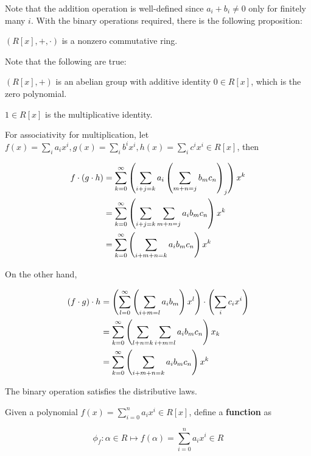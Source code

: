 \documentclass[a4paper,12pt]{article}
\begin{document}
Note that the addition operation is well-defined since $a_{i}+b_{i}\neq 0$ only for finitely many $i$. With the binary operations required, there is the following proposition:\n

\begin{pst}
  $(R[x],+,\cdot)$ is a nonzero commutative ring.\n

  \prf Note that the following are true:

  \begin{alist}
    \item $(R[x],+)$ is an abelian group with additive identity $0\in R[x]$, which is the zero polynomial.
    \item $1\in R[x]$ is the multiplicative identity.
    \item For associativity for multiplication, let $f(x)=\sum_{i}a_{i}x^{i},g(x)=\sum_{i}b^{i}x^{i},h(x)=\sum_{i}c^{i}x^{i}\in R[x]$, then

    $$\begin{aligned}[t]
      f\cdot(g\cdot h)&=\sum_{k=0}^{\infty}\left( \sum_{i+j=k}a_{i}\left( \sum_{m+n=j}b_{m}c_{n}\right)_{j}\right)x^{k}\\
      &=\sum_{k=0}^{\infty}\left( \sum_{i+j=k}\sum_{m+n=j}a_{i}b_{m}c_{n}\right)x^{k}\\
      &=\sum_{k=0}^{\infty}\left( \sum_{i+m+n=k}a_{i}b_{m}c_{n}\right)x^{k}
    \end{aligned}$$\s

    On the other hand,

    $$\begin{aligned}[t]
      (f\cdot g)\cdot h&=\left( \sum_{l=0}^{\infty}\left( \sum_{i+m=l}a_{i}b_{m}\right)x^{l}\right)\cdot\left( \sum_{i}c_{i}x^{i}\right)\\
      &=\sum_{k=0}^{\infty}\left( \sum_{l+n=k}\sum_{i+m=l}a_{i}b_{m}c_{n}\right)x_{k}\\
      &=\sum_{k=0}^{\infty}\left( \sum_{i+m+n=k}a_{i}b_{m}c_{n}\right)x^{k}
    \end{aligned}$$

    \item The binary operation satisfies the distributive laws.
  \end{alist}
\end{pst}\n

\begin{dft}
  Given a polynomial $f(x)=\sum_{i=0}^{n}a_{i}x^{i}\in R[x]$, define a \textbf{function} as

  $$\phi_{f}:\alpha\in R\mapsto f(\alpha)=\sum_{i=0}^{n}a_{i}x^{i}\in R$$
\end{dft}\n
\end{document}

